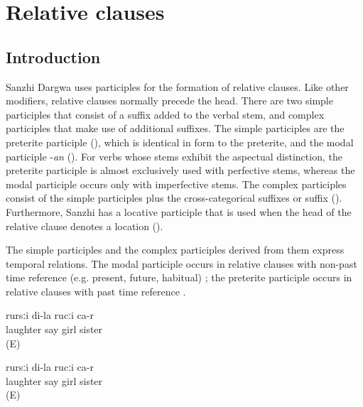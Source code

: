 \chapter{Relative clauses}
\label{cpt:Relative clauses}



\section{Introduction}
\label{sec:relativeclausesintro}

Sanzhi Dargwa uses participles for the formation of relative clauses. Like other modifiers, relative clauses normally precede the head. There are two simple participles that consist of a suffix added to the verbal stem, and complex participles that make use of additional suffixes. The simple participles are the preterite participle (), which is identical in form to the preterite, and the modal participle -\textit{an} (). For verbs whose stems exhibit the aspectual distinction, the preterite participle is almost exclusively used with perfective stems, whereas the modal participle occurs only with imperfective stems. The complex participles consist of the simple participles plus the cross-categorical suffixes  or suffix  (). Furthermore, Sanzhi has a locative participle that is used when the head of the relative clause denotes a location ().

The simple participles and the complex participles derived from them express temporal relations. The modal participle occurs in relative clauses with non-past time reference (e.g. present, future, habitual) ; the preterite participle occurs in relative clauses with past time reference .
%
\begin{exe}
	\ex	\label{ex:The girl who is laughing is my sister}
	\gll	[ħaˁħaˁ	r-ik'ʷ-an]	rursːi	di-la	rucːi	ca-r\\
		laughter	say	girl		sister	\\
	\glt	{} (E)
	
	\ex	\label{ex:The girl who was laughing is my sister}
	\gll	[ħaˁħaˁ	r-ik'-ub]	rursːi	di-la	rucːi	ca-r\\
		laughter	say	girl		sister	\\
	\glt	{} (E)

\end{exe}

